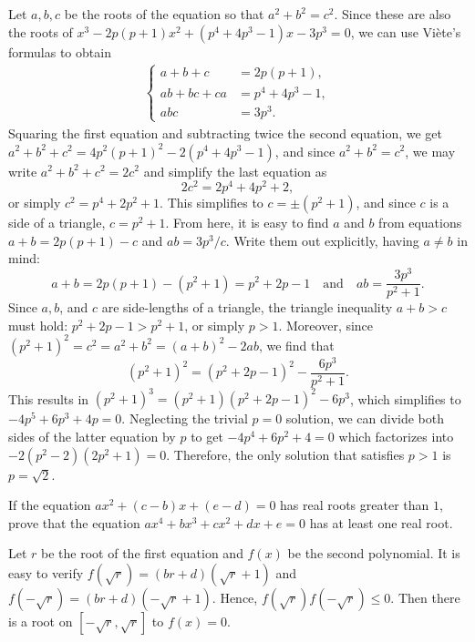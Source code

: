 \begin{solution}[name={Solution by Amir Parvardi}]
    Let $a,b,c$ be the roots of the equation so that $a^2+b^2=c^2$. Since these are also the roots of $x^3 -2p(p+1)x^2+(p^4 +4p^3 -1)x-3p^3 = 0$, we can use Viète's formulas to obtain
    \begin{align*}
    \begin{cases}
    a+b+c &= 2p(p+1),\\
    ab+bc+ca &= p^4+4p^3-1,\\
    abc &= 3p^3.
    \end{cases}
    \end{align*}
    Squaring the first equation and subtracting twice the second equation, we get $a^2+b^2+c^2=4p^2(p+1)^2 - 2(p^4+4p^3-1)$, and since $a^2+b^2=c^2$, we may write $a^2+b^2+c^2=2c^2$ and simplify the last equation as \[2c^2 = 2 p^4 + 4 p^2 + 2,\] or simply $c^2=p^4+2p^2+1$. This simplifies to $c=\pm(p^2+1)$, and since $c$ is a side of a triangle, $c=p^2+1$. From here, it is easy to find $a$ and $b$ from equations $a+b = 2p(p+1)-c$ and $ab=3p^3/c$. Write them out explicitly, having $a\neq b$ in mind:
    \[a+b = 2p(p+1) - (p^2+1) = p^2 +2p - 1 \quad \text{and} \quad ab = \frac{3p^3}{p^2+1}.\]
    Since $a,b$, and $c$ are side-lengths of a triangle, the triangle inequality $a+b>c$ must hold: $p^2+2p-1 > p^2+1$, or simply $p>1$. Moreover, since $(p^2+1)^2=c^2=a^2+b^2=(a+b)^2-2ab$, we find that \[(p^2+1)^2 = ( p^2 +2p - 1)^2 - \frac{6p^3}{p^2+1}.\]
    This results in $(p^2+1)^3 = (p^2+1)( p^2 +2p - 1)^2 - 6p^3$, which simplifies to $-4 p^5 + 6 p^3 + 4 p = 0$. Neglecting the trivial $p=0$ solution, we can divide both sides of the latter equation by $p$ to get $-4p^4+6p^2+4=0$ which factorizes into $-2 (p^2 - 2) (2 p^2 + 1) = 0$. Therefore, the only solution that satisfies $p>1$ is $\boxed{p=\sqrt 2}$.
\end{solution}


\begin{question}[name={1995 Greece}]
    If the equation $ax^2+(c-b)x+(e-d)=0$ has real roots greater than $1$, prove that the equation $ax^4+bx^3+cx^2+dx+e=0$ has at least one real root.
\end{question}

\begin{solution}
Let $ r$ be the root of the first equation and $ f(x)$ be the second polynomial.
It is easy to verify $f(\sqrt r)=(br+d)(\sqrt r+1)$ and $f(-\sqrt r)=(br+d)(-\sqrt r+1)$.
Hence, $f(\sqrt r)f(-\sqrt r)\leq 0$. Then there is a root on $[-\sqrt r,\sqrt r]$ to $f(x)=0$.
\end{solution}



